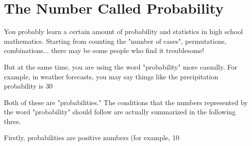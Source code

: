 \documentclass{ltjbook}
\begin{document}
\section{The Number Called Probability}
You probably learn a certain amount of probability and statistics in high school mathematics. Starting from counting the "number of cases", permutations, combinations... there may be some people who find it troublesome!

But at the same time, you are using the word "probability" more casually. For example, in weather forecasts, you may say things like the precipitation probability is 30%

Both of these are "probabilities." The conditions that the numbers represented by the word "probability" should follow are actually summarized in the following three.


Firstly, probabilities are positive numbers (for example, 10%
\end{document}
